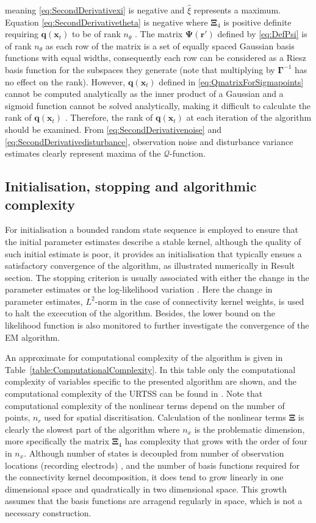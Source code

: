 \documentclass[]{article}
\begin{document}
meaning \eqref{eq:SecondDerivativexi} is negative and $\hat{\xi}$ represents a maximum. Equation \eqref{eq:SecondDerivativetheta} is negative where $\boldsymbol\Xi_4$ is positive definite requiring $\mathbf q(\mathbf x_t)$ to be of  rank $n_{\theta}$ \cite{Golub1996}. The matrix $\boldsymbol\Psi(\mathbf r')$ defined by \eqref{eq:DefPsi} is of rank $n_{\theta}$ as each row of the matrix is a set of equally spaced Gaussian basis functions with equal widths, consequently each row can be considered as a Riesz basis function for the subspaces they generate \cite{Ferrari2004} (note that multiplying by $\mathbf \Gamma^{-1}$ has no effect on the rank). However, $\mathbf q(\mathbf x_t)$ defined in \eqref{eq:QmatrixForSigmapoints} cannot be computed analytically as the inner product of a Gaussian and a sigmoid function cannot be solved analytically, making it difficult to calculate the rank of $\mathbf q(\mathbf x_t)$ . Therefore, the rank of $\mathbf q(\mathbf x_t)$ at each iteration of the algorithm should be examined. From \eqref{eq:SecondDerivativenoise} and \eqref{eq:SecondDerivativedisturbance}, observation noise and disturbance variance estimates clearly represent maxima of the $\mathcal{Q}$-function.
\subsection{Initialisation, stopping and algorithmic complexity}
For initialisation a bounded random state sequence is employed to ensure that the initial parameter estimates describe a stable kernel, although the quality of such initial estimate is poor, it provides an initialisation that typically ensues a satisfactory convergence of the algorithm, as illustrated numerically in Result section. The stopping criterion is usually associated with either the change in the parameter estimates or the log-likelihood variation \cite{McLachlan1997}. Here the change in parameter estimates, $L^2$-norm in the case of connectivity kernel weights, is used to halt the excecution of the algorithm. Besides, the lower bound on the likelihood function is also monitored to further investigate the convergence of the EM algorithm.  

An approximate for computational complexity of the algorithm is given in Table~\ref{table:ComputationalComplexity}.  In this table only the computational complexity of variables specific to the presented algorithm are shown, and the computational complexity of the URTSS can be found in \cite{Sarkka2010}. Note that computational complexity of the nonlinear terms depend on the number of points, $n_r$ used for spatial discritisation. Calculation of the nonlinear terms $\boldsymbol\Xi$ is clearly the slowest part of the algorithm where $n_x$ is the problematic dimension, more specifically the matrix $\boldsymbol\Xi_4 $ has complexity that grows with the order of four in $n_x$. Although number of states  is decoupled from number of observation locations (recording electrods) , and the number of basis functions required for the connectivity kernel decomposition, it does tend to grow linearly in one dimensional space and quadratically in two dimensional space. This growth assumes that the basis functions are arragend regularly in space, which is not a necessary construction.
 
\end{document}
